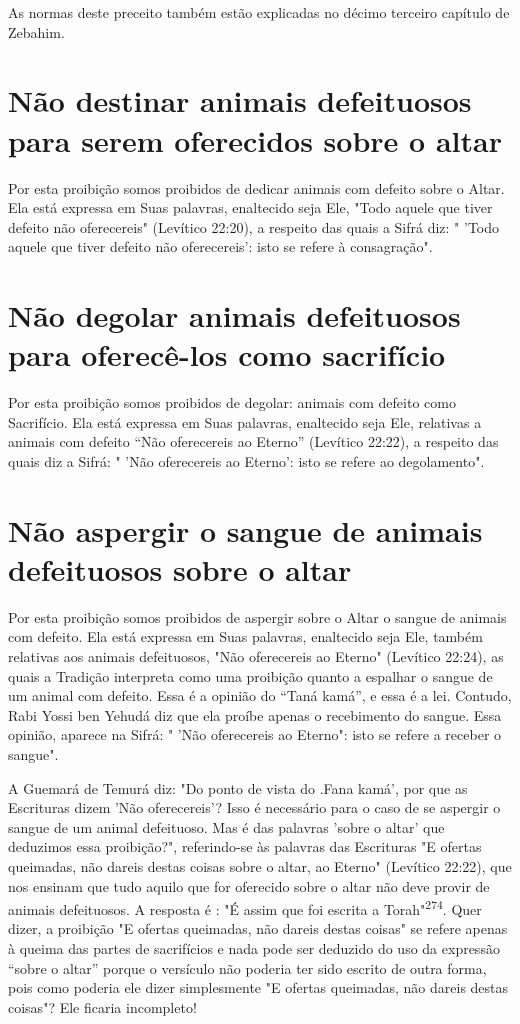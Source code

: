As normas deste preceito também estão explicadas no décimo ter­ceiro
capítulo de Zebahim.

\section{Não destinar animais defeituosos para serem oferecidos sobre o altar}

Por esta proibição somos proibidos de dedicar animais com defeito sobre
o Altar. Ela está expressa em Suas palavras, enaltecido seja Ele, "Todo
aquele que tiver defeito não oferecereis" (Levítico 22:20), a respeito
das quais a Sifrá diz: " 'Todo aquele que tiver defeito não
oferecereis': isto se refere à consagração".

\section{Não degolar animais defeituosos para oferecê-los como sacrifício}

Por esta proibição somos proibidos de degolar: animais com defeito como
Sacrifício. Ela está expressa em Suas palavras, enaltecido seja Ele,
relativas a animais com defeito ``Não oferecereis ao Eterno'' (Levítico
22:22), a respeito das quais diz a Sifrá: " 'Não oferecereis ao Eterno':
isto se refere ao degolamento".


\section{Não aspergir o sangue de animais defeituosos sobre o altar}

Por esta proibição somos proibidos de aspergir sobre o Altar o san­gue
de animais com defeito. Ela está expressa em Suas palavras, enaltecido
seja Ele, também relativas aos animais defeituosos, "Não oferecereis ao
Eterno" (Le­vítico 22:24), as quais a Tradição interpreta como uma
proibição quanto a es­palhar o sangue de um animal com defeito. Essa é a
opinião do ``Taná kamá'', e essa é a lei. Contudo, Rabi Yossi ben Yehudá
diz que ela proíbe apenas o re­cebimento do sangue. Essa opinião,
aparece na Sifrá: " 'Não oferecereis ao Eter­no": isto se refere a
receber o sangue".

A Guemará de Temurá diz: "Do ponto de vista do .Fana
kamá', por que as Escrituras dizem 'Não oferecereis'? Isso é necessário
para o caso de se aspergir o sangue de um animal defeituoso. Mas é das
palavras 'sobre o altar' que deduzimos essa proibição?", referindo-se às
palavras das Escrituras "E ofertas queimadas, não dareis destas coisas
sobre o altar, ao Eterno" (Levítico 22:22), que nos ensinam que tudo
aquilo que for oferecido sobre o altar não deve pro­vir de animais
defeituosos. A resposta é : "É assim que foi escrita a
Torah"\textsuperscript{274}. Quer dizer, a proibição "E ofertas
queimadas, não dareis destas coisas" se refe­re apenas à queima das
partes de sacrifícios e nada pode ser deduzido do uso da expressão
``sobre o altar'' porque o versículo não poderia ter sido escrito de outra
forma, pois como poderia ele dizer simplesmente "E ofertas queima­das,
não dareis destas coisas"? Ele ficaria incompleto!

